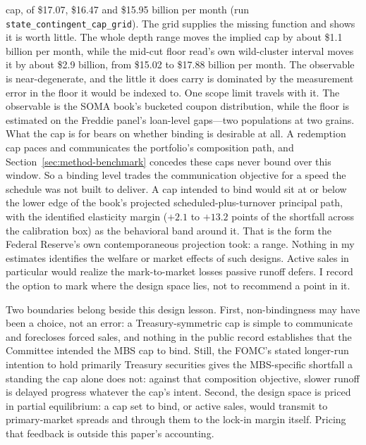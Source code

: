 \documentclass[12pt]{article}
\begin{document}
cap, of \$17.07, \$16.47 and \$15.95 billion per month (run \texttt{state\_contingent\_cap\_grid}). The grid supplies the missing function and shows it is worth little. The whole depth range moves the implied cap by about \$1.1 billion per month, while the mid-cut floor read's own wild-cluster interval moves it by about \$2.9 billion, from \$15.02 to \$17.88 billion per month. The observable is near-degenerate, and the little it does carry is dominated by the measurement error in the floor it would be indexed to. One scope limit travels with it. The observable is the SOMA book's bucketed coupon distribution, while the floor is estimated on the Freddie panel's loan-level gaps---two populations at two grains. What the cap is for bears on whether binding is desirable at all. A redemption cap paces and communicates the portfolio's composition path, and Section~\ref{sec:method-benchmark} concedes these caps never bound over this window. So a binding level trades the communication objective for a speed the schedule was not built to deliver. A cap intended to bind would sit at or below the lower edge of the book's projected scheduled-plus-turnover principal path, with the identified elasticity margin ($+2.1$ to $+13.2$ points of the shortfall across the calibration box) as the behavioral band around it. That is the form the Federal Reserve's own contemporaneous projection took: a range. Nothing in my estimates identifies the welfare or market effects of such designs. Active sales in particular would realize the mark-to-market losses passive runoff defers. I record the option to mark where the design space lies, not to recommend a point in it.

Two boundaries belong beside this design lesson. First, non-bindingness may have been a choice, not an error: a Treasury-symmetric cap is simple to communicate and forecloses forced sales, and nothing in the public record establishes that the Committee intended the MBS cap to bind. Still, the FOMC's stated longer-run intention to hold primarily Treasury securities gives the MBS-specific shortfall a standing the cap alone does not: against that composition objective, slower runoff is delayed progress whatever the cap's intent. Second, the design space is priced in partial equilibrium: a cap set to bind, or active sales, would transmit to primary-market spreads and through them to the lock-in margin itself. Pricing that feedback is outside this paper's accounting.
\end{document}
